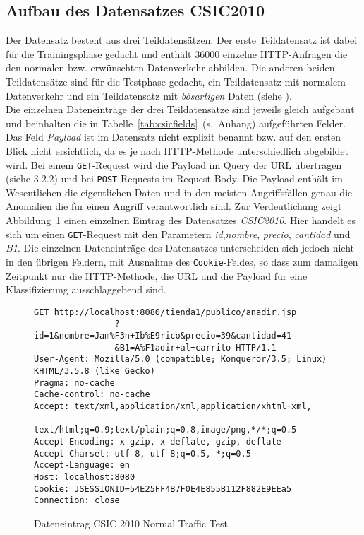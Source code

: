 %

\subsection{Aufbau des Datensatzes CSIC2010}


Der Datensatz besteht aus drei Teildatensätzen. Der erste Teildatensatz ist dabei für die Trainingsphase gedacht und enthält 36000 einzelne HTTP-Anfragen die den normalen bzw. erwünschten Datenverkehr abbilden. Die anderen beiden Teildatensätze sind für die Testphase gedacht, ein Teildatensatz mit normalem Datenverkehr und ein Teildatensatz mit \emph{bösartigen} Daten (siehe \cite{csic2010}).\\ Die einzelnen Dateneinträge der drei Teildatensätze sind jeweils gleich aufgebaut und beinhalten die in Tabelle~\ref{tab:csicfields}~(s.~Anhang) aufgeführten Felder. Das Feld \emph{Payload} ist im Datensatz nicht explizit benannt bzw. auf den ersten Blick nicht ersichtlich, da es je nach HTTP-Methode unterschiedlich abgebildet wird. Bei einem \verb=GET=-Request wird die Payload im Query der URL übertragen (siehe \cite{rfc2626} 3.2.2) und bei \verb=POST=-Requests im Request Body. Die Payload enthält im Wesentlichen die eigentlichen Daten und in den meisten Angriffsfällen genau die Anomalien die für einen Angriff verantwortlich sind. Zur Verdeutlichung zeigt Abbildung~\ref{fig:ccex} einen einzelnen Eintrag des Datensatzes \emph{CSIC2010}. Hier handelt es sich um einen \verb=GET=-Request mit den Parametern \emph{id},\emph{nombre}, \emph{precio}, \emph{cantidad} und \emph{B1}. Die einzelnen Dateneinträge des Datensatzes unterscheiden sich jedoch nicht in den übrigen Feldern, mit Ausnahme des \verb=Cookie=-Feldes, so dass zum damaligen Zeitpunkt nur die HTTP-Methode, die URL und die Payload für eine Klassifizierung ausschlaggebend sind.


\begin{figure}
  \centering
        \caption{Dateneintrag CSIC 2010 Normal Traffic Test}
        \label{fig:ccex}
        \begin{lstlisting}[basicstyle=\footnotesize]
GET http://localhost:8080/tienda1/publico/anadir.jsp
                ?id=1&nombre=Jam%F3n+Ib%E9rico&precio=39&cantidad=41
                &B1=A%F1adir+al+carrito HTTP/1.1
User-Agent: Mozilla/5.0 (compatible; Konqueror/3.5; Linux) KHTML/3.5.8 (like Gecko)
Pragma: no-cache
Cache-control: no-cache
Accept: text/xml,application/xml,application/xhtml+xml,
                text/html;q=0.9;text/plain;q=0.8,image/png,*/*;q=0.5
Accept-Encoding: x-gzip, x-deflate, gzip, deflate
Accept-Charset: utf-8, utf-8;q=0.5, *;q=0.5
Accept-Language: en
Host: localhost:8080
Cookie: JSESSIONID=54E25FF4B7F0E4E855B112F882E9EEa5
Connection: close
\end{lstlisting}
\end{figure}

